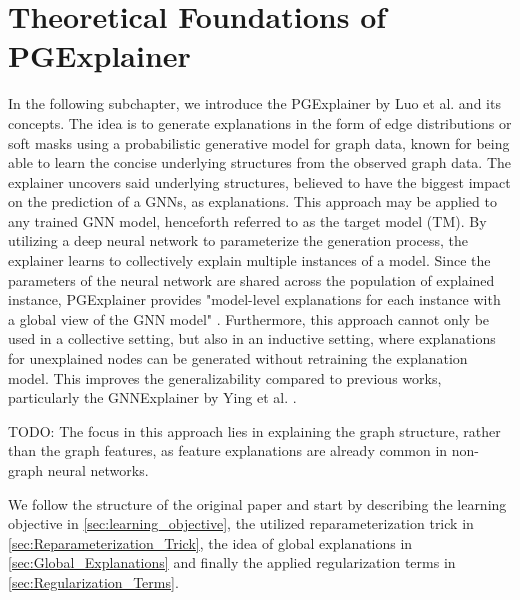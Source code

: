 \section{Theoretical Foundations of PGExplainer}
\label{sec:TheoryPGE}

In the following subchapter, we introduce the PGExplainer by Luo et al. \cite{luo2020parameterized} and its concepts. The idea is to generate explanations in the form of edge distributions or soft masks using a probabilistic generative model for graph data, known for being able to learn the concise underlying structures from the observed graph data. The explainer uncovers said underlying structures, believed to have the biggest impact on the prediction of a GNNs, as explanations. This approach may be applied to any trained GNN model, henceforth referred to as the target model (TM). 
By utilizing a deep neural network to parameterize the generation process, the explainer learns to collectively explain multiple instances of a model. Since the parameters of the neural network are shared across the population of explained instance, PGExplainer provides "model-level explanations for each instance with a global view of the GNN model" \cite{luo2020parameterized}. Furthermore, this approach cannot only be used in a collective setting, but also in an inductive setting, where explanations for unexplained nodes can be generated without retraining the explanation model. This improves the generalizability compared to previous works, particularly the GNNExplainer by Ying et al. \cite{ying2019gnnexplainer}.


TODO: The focus in this approach lies in explaining the graph structure, rather than the graph features, as feature explanations are already common in non-graph neural networks. \bigskip

We follow the structure of the original paper \cite{luo2020parameterized} and start by describing the learning objective in \ref{sec:learning_objective}, the utilized reparameterization trick in \ref{sec:Reparameterization_Trick}, the idea of global explanations in \ref{sec:Global_Explanations} and finally the applied regularization terms in \ref{sec:Regularization_Terms}.

